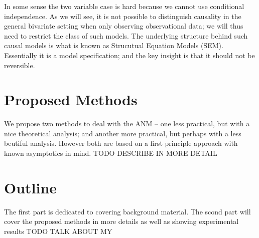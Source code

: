 In some sense the two variable case is hard because we cannot use conditional independence. As we will see, 
it is not possible to distinguish causality in the general bivariate setting when only observing 
observational data; we will thus need to restrict 
the class of such models. The underlying structure behind such causal models is what is known as 
Strucutual Equation Models (SEM). Essentially 
it is a model specification; and the key insight is that it should not be reversible. 


\section{Proposed Methods}

We propose two methods to deal with the ANM -- one less practical, but with a nice theoretical
analysis; and another more practical, but perhaps with a less beutiful analysis. However both
are based on a first principle approach with known asymptotics in mind.
TODO DESCRIBE IN MORE DETAIL


\section{Outline}

The first part is dedicated to covering background material. The scond part will cover the 
proposed methods in more details as well as showing experimental results
TODO TALK ABOUT MY

